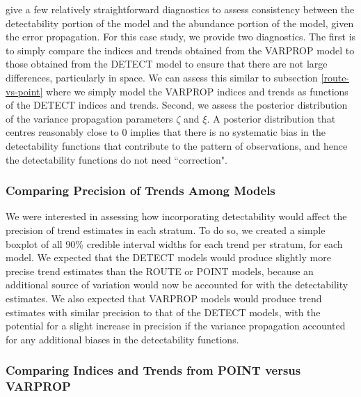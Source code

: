 \par \citet{bravington_variance_2021} give a few relatively straightforward diagnostics to assess consistency between the detectability portion of the model and the abundance portion of the model, given the error propagation.
For this case study, we provide two diagnostics.
The first is to simply compare the indices and trends obtained from the VARPROP model to those obtained from the DETECT model to ensure that there are not large differences, particularly in space. 
We can assess this similar to subsection \ref{route-vs-point} where we simply model the VARPROP indices and trends as functions of the DETECT indices and trends.
Second, we assess the posterior distribution of the variance propagation parameters $\zeta$ and $\xi$.
A posterior distribution that centres reasonably close to 0 implies that there is no systematic bias in the detectability functions that contribute to the pattern of observations, and hence the detectability functions do not need ``correction".

\subsubsection{Comparing Precision of Trends Among Models}

\par We were interested in assessing how incorporating detectability would affect the precision of trend estimates in each stratum.
To do so, we created a simple boxplot of all 90\% credible interval widths for each trend per stratum, for each model.
We expected that the DETECT models would produce slightly more precise trend estimates than the ROUTE or POINT models, because an additional source of variation would now be accounted for with the detectability estimates.
We also expected that VARPROP models would produce trend estimates with similar precision to that of the DETECT models, with the potential for a slight increase in precision if the variance propagation accounted for any additional biases in the detectability functions.

\subsubsection{Comparing Indices and Trends from POINT versus VARPROP}

